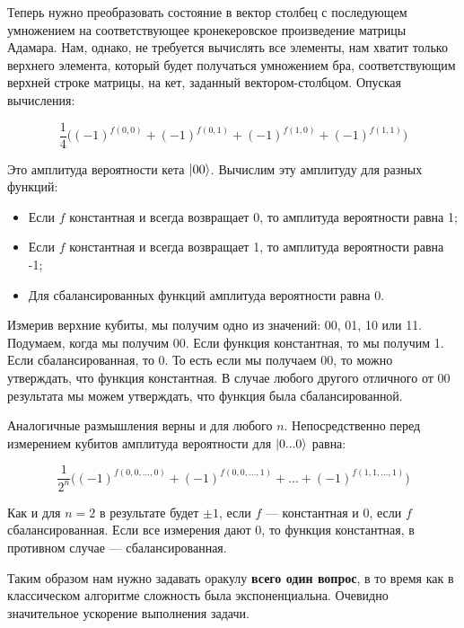 \documentclass[a4paper, 12pt]{article}
\begin{document}
Теперь нужно преобразовать состояние в вектор столбец с последующем умножением на соответствующее кронекеровское произведение матрицы Адамара. Нам, однако, не требуется вычислять все элементы, нам хватит только верхнего элемента, который будет получаться умножением бра, соответствующим верхней строке матрицы, на кет, заданный вектором-столбцом. Опуская вычисления:

\begin{equation}
	\frac{1}{4}\bigg((-1)^{f(0, 0)} + (-1)^{f(0, 1)} + (-1)^{f(1, 0)} + (-1)^{f(1, 1)}\bigg)
\end{equation}

Это амплитуда вероятности кета $\ket{00}$. Вычислим эту амплитуду для разных функций:

\begin{itemize}
	\item Если $f$ константная и всегда возвращает 0, то амплитуда вероятности равна 1;
	
	\item Если $f$ константная и всегда возвращает 1, то амплитуда вероятности равна -1;
	
	\item Для сбалансированных функций амплитуда вероятности равна 0.  
\end{itemize}

Измерив верхние кубиты, мы получим одно из значений: 00, 01, 10 или 11. Подумаем, когда мы получим 00. Если функция константная, то мы получим 1. Если сбалансированная, то 0. То есть если мы получаем 00, то можно утверждать, что функция константная. В случае любого другого отличного от 00 результата мы можем утверждать, что функция была сбалансированной.

Аналогичные размышления верны и для любого $n$. Непосредственно перед измерением кубитов амплитуда вероятности для $\ket{0...0}$ равна:

\begin{equation}
	\frac{1}{2^n}\bigg((-1)^{f(0, 0, ..., 0)} + (-1)^{f(0, 0, ..., 1)} + ... + (-1)^{f(1, 1, ..., 1)}\bigg)
\end{equation}

Как и для $n=2$ в результате будет $\pm1$, если $f$ --- константная и 0, если $f$ сбалансированная. Если все измерения дают 0, то функция константная, в противном случае --- сбалансированная.

Таким образом нам нужно задавать оракулу \textbf{всего один вопрос}, в то время как в классическом алгоритме сложность была экспоненциальна. Очевидно значительное ускорение выполнения задачи.
\end{document}
